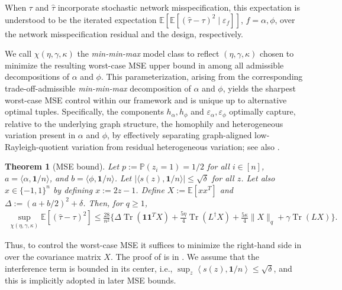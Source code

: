 \documentclass[12pt]{article}
\newtheorem{theorem}{Theorem}
\theoremstyle{definition}
\numberwithin{equation}{section}
\numberwithin{figure}{section}
\newcommand\dotp[1]{\left\langle #1 \right\rangle}
\numberwithin{equation}{section}
\numberwithin{figure}{section}
\begin{document}
When $\tau$ and $\hat{\tau}$ incorporate stochastic network misspecification, this expectation is understood to be the iterated expectation $\mathbb{E}[\mathbb{E}[(\hat{\tau} - \tau)^2 \mid \varepsilon_f]]$, $f=\alpha, \phi$, over the network misspecification residual and the design, respectively. 

We call $\chi(\eta, \gamma, \kappa)$ the \textit{min-min-max} model class to reflect $(\eta,\gamma,\kappa)$ chosen to minimize the resulting worst-case MSE upper bound in  among all admissible decompositions of $\alpha$ and $\phi$. This parameterization, arising from the corresponding trade-off-admissible \textit{min-min-max} decomposition of $\alpha$ and $\phi$, yields the sharpest worst-case MSE control within our framework and is unique up to alternative optimal tuples.  
Specifically, the components $h_\alpha, h_\phi$ and $\varepsilon_\alpha, \varepsilon_\phi$ optimally capture, relative to the underlying graph structure, the homophily and heterogeneous variation present in $\alpha$ and $\phi$, by effectively separating graph-aligned low-Rayleigh-quotient variation from residual heterogeneous variation; see also . 

\begin{theorem}[MSE bound] \label{thm:mse_bound_general_HT_symmetric}
Let $p:= \mathbb{P}(z_i = 1) = 1/2$ for all $i \in [n]$, $a = \langle \alpha, \mathbf{1}/n\rangle$, and $b = \langle \phi, \mathbf{1}/n\rangle$. Let $|\langle s(z), \mathbf{1}/n\rangle| \leq \sqrt{\delta}$ for all $z$. Let also $x \in \{-1, 1\}^n$ by defining $x := 2z-1$. Define $X := \mathbb{E}[xx^T]$ and $\Delta := (a + b/2)^2 + \delta$. Then, for $q \geq 1$,
     \begin{align}\label{eq: MSE bound}
         \sup_{\chi(\eta, \gamma, \kappa)} \mathbb{E}[(\hat{\tau} - \tau)^2] \leq \frac{28}{n^2} \{ \Delta \operatorname{Tr}(\mathbf{1}\mathbf{1}^T X) + \frac{5\eta}{4}\operatorname{Tr}(L^{\dagger} X) + \frac{5\kappa}{4}\|X\|_{q} + \gamma \operatorname{Tr}(L X) \}.
     \end{align}
\end{theorem}

Thus, to control the worst-case MSE it suffices to minimize the right-hand side in  over the covariance matrix $X$. The proof of  is in . We assume that the interference term is bounded in its center, i.e., $\sup_z \dotp{s({z}), \mathbf{1}/n} \leq \sqrt{\delta}$, and this is implicitly adopted in later MSE bounds. 
\end{document}
